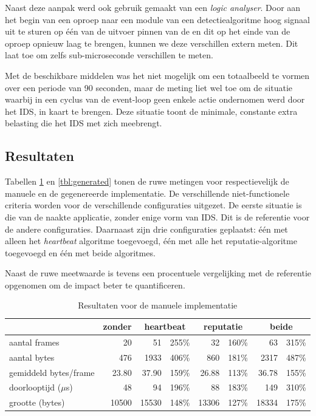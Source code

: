 Naast deze aanpak werd ook gebruik gemaakt van een \emph{logic analyser}. Door
aan het begin van een oproep naar een module van een detectiealgoritme hoog
signaal uit te sturen op \'e\'en van de uitvoer pinnen van de \mcu en dit op
het einde van de oproep opnieuw laag te brengen, kunnen we deze verschillen
extern meten. Dit laat toe om zelfs sub-microseconde verschillen te meten.

Met de beschikbare middelen was het niet mogelijk om een totaalbeeld te vormen
over een periode van 90 seconden, maar de meting liet wel toe om de situatie
waarbij in een cyclus van de event-loop geen enkele actie ondernomen werd door
het IDS, in kaart te brengen. Deze situatie toont de minimale, constante extra
belasting die het IDS met zich meebrengt.

\subsection{Resultaten}

Tabellen \ref{tbl:manual} en \ref{tbl:generated} tonen de ruwe metingen voor
respectievelijk de manuele en de gegenereerde implementatie. De verschillende
niet-functionele criteria worden voor de verschillende configuraties uitgezet.
De eerste situatie is die van de naakte applicatie, zonder enige vorm van IDS.
Dit is de referentie voor de andere configuraties. Daarnaast zijn drie
configuraties geplaatst: \'e\'en met alleen het \emph{heartbeat} algoritme
toegevoegd, \'e\'en met alle het reputatie-algoritme toegevoegd en \'e\'en met
beide algoritmes.

Naast de ruwe meetwaarde is tevens een procentuele vergelijking met de
referentie opgenomen om de impact beter te quantificeren.

\begin{table}[H]
  \centering
  \begin{tabular}{l|r|rr|rr|rr}
  \hline
      & zonder & \multicolumn{2}{c|}{heartbeat} & \multicolumn{2}{c|}{reputatie} & \multicolumn{2}{c}{beide} \\
  \hline
  \hline

aantal frames         &    20    &    51    & 255\% &    32    & 160\% &    63    & 315\% \\
aantal bytes          &   476    &  1933    & 406\% &   860    & 181\% &  2317    & 487\% \\
gemiddeld bytes/frame &    23.80 &    37.90 & 159\% &    26.88 & 113\% &    36.78 & 155\% \\
doorlooptijd ($\mu$s) &    48    &    94    & 196\% &    88    & 183\% &   149    & 310\% \\
grootte (bytes)       & 10500    & 15530    & 148\% & 13306    & 127\% & 18334    & 175\% \\

  \hline
  \end{tabular}
  \caption{Resultaten voor de manuele implementatie}
  \label{tbl:manual}
\end{table}

